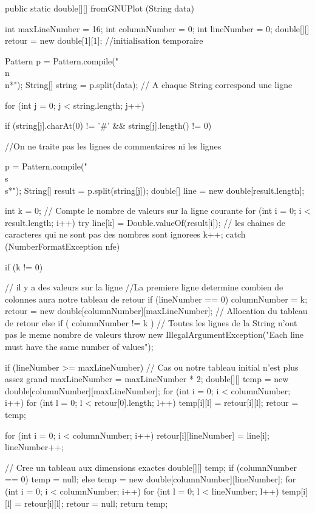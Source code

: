 \begin{code}
   public static double[][] fromGNUPlot (String data) \begin{hide} {
      int maxLineNumber = 16;
      int columnNumber = 0;
      int lineNumber = 0;
      double[][] retour = new double[1][1]; //initialisation temporaire

      Pattern p = Pattern.compile("\\n\\n*");
      String[] string = p.split(data); // A chaque String correspond une ligne

      for (int j = 0; j < string.length; j++) {
         if (string[j].charAt(0) != '#' && string[j].length() != 0) {
            //On ne traite pas les lignes de commentaires ni les lignes

            p = Pattern.compile("\\s\\s*");
            String[] result = p.split(string[j]);
            double[] line = new double[result.length];

            int k = 0; // Compte le nombre de valeurs sur la ligne courante
            for (int i = 0; i < result.length; i++) {
               try {
                  line[k] = Double.valueOf(result[i]);   // les chaines de caracteres qui ne sont pas des nombres sont ignorees
                  k++;
               } catch (NumberFormatException nfe) {}
            }

            if (k != 0) { // il y a des valeurs sur la ligne
               //La premiere ligne determine combien de colonnes aura notre tableau de retour
               if (lineNumber == 0) {
                  columnNumber = k;
                  retour = new double[columnNumber][maxLineNumber]; // Allocation du tableau de retour
               } else if ( columnNumber != k ) // Toutes les lignes de la String n'ont pas le meme nombre de valeurs
                  throw new IllegalArgumentException("Each line must have the same number of values");

               if (lineNumber >= maxLineNumber) { // Cas ou notre tableau initial n'est plus assez grand
                  maxLineNumber = maxLineNumber * 2;
                  double[][] temp = new double[columnNumber][maxLineNumber];
                  for (int i = 0; i < columnNumber; i++)
                     for (int l = 0; l < retour[0].length; l++)
                        temp[i][l] = retour[i][l];
                  retour = temp;
               }

               for (int i = 0; i < columnNumber; i++)
                  retour[i][lineNumber] = line[i];
               lineNumber++;
            }
         }
      }
      // Cree un tableau aux dimensions exactes
      double[][] temp;
      if (columnNumber == 0)
         temp = null;
      else
         temp = new double[columnNumber][lineNumber];
      for (int i = 0; i < columnNumber; i++)
         for (int l = 0; l < lineNumber; l++)
            temp[i][l] = retour[i][l];
      retour = null;
      return temp;
   }\end{hide}
\end{code}
